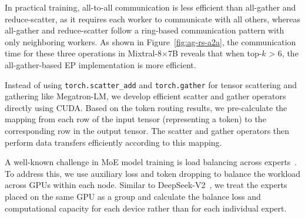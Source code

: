 In practical training, all-to-all communication is less efficient than all-gather and reduce-scatter, as it requires each worker to communicate with all others, whereas all-gather and reduce-scatter follow a ring-based communication pattern with only neighboring workers. As shown in Figure~\ref{fig:ag-rs-a2a}, the communication time for these three operations in Mixtral-8$\times$7B reveals that when top-$k$ > 6, the all-gather-based EP implementation is more efficient.




 Instead of using \texttt{torch.scatter\_add} and \texttt{torch.gather} for tensor scattering and gathering like Megatron-LM, we develop efficient scatter and gather operators directly using CUDA. Based on the token routing results, we pre-calculate the mapping from each row of the input tensor (representing a token) to the corresponding row in the output tensor. The scatter and gather operators then perform data transfers efficiently according to this mapping. 

 A well-known challenge in MoE model training is load balancing across experts~\cite{li2023accelerating, liu2024deepseek}. To address this, we use auxiliary loss and token dropping to balance the workload across GPUs within each node. Similar to DeepSeek-V2~\cite{liu2024deepseek}, we treat the experts placed on the same GPU as a group and calculate the balance loss and computational capacity for each device rather than for each individual expert. 

